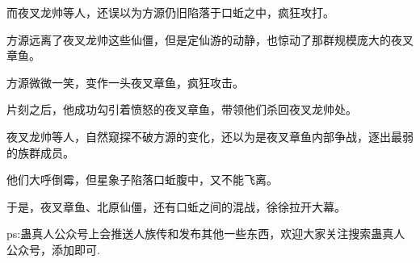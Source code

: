 \begin{this_body}
而夜叉龙帅等人，还误以为方源仍旧陷落于口蚯之中，疯狂攻打。

方源远离了夜叉龙帅这些仙僵，但是定仙游的动静，也惊动了那群规模庞大的夜叉章鱼。

方源微微一笑，变作一头夜叉章鱼，疯狂攻击。

片刻之后，他成功勾引着愤怒的夜叉章鱼，带领他们杀回夜叉龙帅处。

夜叉龙帅等人，自然窥探不破方源的变化，还以为是夜叉章鱼内部争战，逐出最弱的族群成员。

他们大呼倒霉，但星象子陷落口蚯腹中，又不能飞离。

于是，夜叉章鱼、北原仙僵，还有口蚯之间的混战，徐徐拉开大幕。

ps:蛊真人公众号上会推送人族传和发布其他一些东西，欢迎大家关注搜索蛊真人公众号，添加即可.

\end{this_body}

